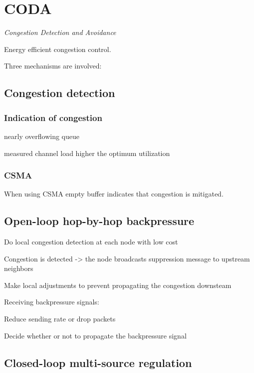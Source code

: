 \section{CODA} 
\emph{Congestion Detection and Avoidance}

Energy efficient congestion control.

Three mechanisms are involved:
\subsection{Congestion detection}

\subsubsection{Indication of congestion}
\begin{description} 
	\item nearly overflowing queue
	\item measured channel load higher the optimum utilization
\end{description}

\subsubsection{CSMA}
When using CSMA empty buffer indicates that congestion is mitigated.


\subsection{Open-loop hop-by-hop backpressure}

\begin{description}
	\item Do local congestion detection at each node with low cost
	\item Congestion is detected -> the node broadcasts suppression message to
		upstream neighbors
	\item Make local adjustments to prevent propagating the congestion
		downsteam
\end{description}

Receiving backpressure signals:
\begin{description}
	\item Reduce sending rate or drop packets
	\item Decide whether or not to propagate the backpressure signal
\end{description}

\subsection{Closed-loop multi-source regulation}

